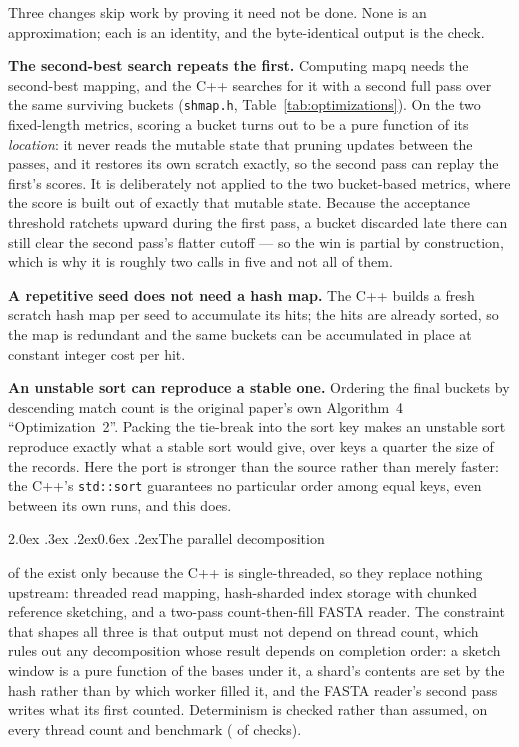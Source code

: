\documentclass[10pt,a4paper,twocolumn]{article}
\makeatletter
\renewcommand\section{\@startsection{section}{1}{0pt}%
  {2.0ex \@plus .3ex \@minus .2ex}{0.6ex \@plus.2ex}{\normalsize\bfseries}}
\makeatother
\begin{document}
Three changes skip work by proving it need not be done. None is an
approximation; each is an identity, and the byte-identical output is the check.

\textbf{The second-best search repeats the first.} Computing mapq needs the
second-best mapping, and the C++ searches for it with a second full pass over
the same surviving buckets (\texttt{shmap.h}, Table~\ref{tab:optimizations}). On
the two fixed-length metrics, scoring a bucket turns out to be a pure function
of its \emph{location}: it never reads the mutable state that pruning updates
between the passes, and it restores its own scratch exactly, so the second pass
can replay the first's scores. It is deliberately not applied to the two
bucket-based metrics, where the score is built out of exactly that mutable
state. Because the acceptance threshold ratchets upward during the first pass, a
bucket discarded late there can still clear the second pass's flatter cutoff ---
so the win is partial by construction, which is why it is roughly two calls in
five and not all of them.

\textbf{A repetitive seed does not need a hash map.} The C++ builds a fresh
scratch hash map per seed to accumulate its hits; the hits are already sorted,
so the map is redundant and the same buckets can be accumulated in place at
constant integer cost per hit.

\textbf{An unstable sort can reproduce a stable one.} Ordering the final buckets
by descending match count is the original paper's own
Algorithm~4 ``Optimization~2''. %
Packing the tie-break into the sort key makes an unstable sort reproduce exactly
what a stable sort would give, over keys a quarter the size of the records. Here
the port is stronger than the source rather than merely faster: the C++'s
\texttt{std::sort} guarantees no particular order among equal keys, even between
its own runs, and this does.

\section{The parallel decomposition}

\shmNumParallelOptimizations{} of the \shmNumOptimizations{} exist only because
the C++ is single-threaded, so they replace nothing upstream: threaded read
mapping, hash-sharded index storage with chunked reference sketching, and a
two-pass count-then-fill FASTA reader. The constraint that shapes all three is
that output must not depend on thread count, which rules out any decomposition
whose result depends on completion order: a sketch window is a pure function of
the bases under it, a shard's contents are set by the hash rather than by which
worker filled it, and the FASTA reader's second pass writes what its first
counted. Determinism is checked rather than assumed, on every thread count
and benchmark (\shmDetChecks{} of \shmDetTotal{} checks).
\end{document}
